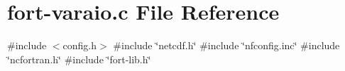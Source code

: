 \hypertarget{fort-varaio_8c}{}\section{fort-\/varaio.c File Reference}
\label{fort-varaio_8c}
{\ttfamily \#include $<$config.\+h$>$}\newline
{\ttfamily \#include \char`\"{}netcdf.\+h\char`\"{}}\newline
{\ttfamily \#include \char`\"{}nfconfig.\+inc\char`\"{}}\newline
{\ttfamily \#include \char`\"{}ncfortran.\+h\char`\"{}}\newline
{\ttfamily \#include \char`\"{}fort-\/lib.\+h\char`\"{}}\newline
